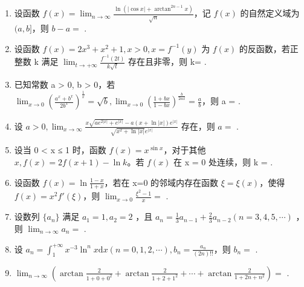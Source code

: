 \documentclass[12pt, a4paper]{ctexart}
\begin{document}
\begin{enumerate}[start=20]
    \item 设函数 $ f(x) = \lim_{n \to \infty} \frac{\ln\left(\left|\cos x\right| + \arctan^{2n-1}x\right)}{\sqrt{n}} $，记 $ f(x) $ 的自然定义域为 $ (a, b] $，则 $ b - a = $ \underline{\hspace{2cm}}.
    
    \item 设函数 $ f(x)=2x^{3}+x^{2}+1, x>0, x=f^{-1}(y) $ 为 $ f(x) $ 的反函数，若正整数 k 满足 $ \lim_{t\to+\infty}\frac{f^{-1}(2t)}{k\sqrt{t}} $ 存在且非零，则 k= \underline{\hspace{2cm}}.

    \item 已知常数 a > 0, b > 0，若 $ \lim_{x \to 0} \left( \frac{a^x + b^x}{2b^x} \right)^{\frac{1}{x}} = \sqrt{b}, \lim_{x \to 0} \left( \frac{1 + bx}{1 - bx} \right)^{\frac{b}{2ax}} = \frac{a}{b} $，则 a = \underline{\hspace{2cm}}.

    \item 设 $ a > 0, \lim_{x \to \infty} \frac{x \sqrt{a e^{2|x|} + e^{|x|}} - a(x + \ln|x|) e^{|x|}}{\sqrt{x^2 + \ln|x|} e^{|x|}} $ 存在，则 $ a = $ \underline{\hspace{2cm}}.

    \item 设当 0 < x ≤ 1 时，函数 $ f(x) = x^{\sin x} $，对于其他 $ x, f(x) = 2f(x + 1) - \ln k $。若 $ f(x) $ 在 x = 0 处连续，则 k = \underline{\hspace{2cm}}.

    \item 设函数 $ f(x)=\ln\frac{1-x}{1+x} $，若在 x=0 的邻域内存在函数 $ \xi=\xi(x) $，使得 $ f(x)=x^{2}f'(\xi) $，则 $ \lim_{x\to0}\frac{\xi^{2}-1}{x}= $ \underline{\hspace{2cm}}.

    \item 设数列 $ \{a_{n}\} $ 满足 $ a_{1}=1, a_{2}=2 $ ，且 $ a_{n}=\frac{1}{3}a_{n-1}+\frac{2}{3}a_{n-2}(n=3,4,5,\cdots) $ ，则 $ \lim_{n\to\infty}a_n= $ \underline{\hspace{2cm}}.

    \item 设 $ a_{n}=\int_{1}^{+\infty}x^{-3}\ln^{n}x\mathrm{d}x\left(n=0,1,2,\cdots\right),b_{n}=\frac{a_{n}}{(2n)!!} $，则 $ b_{n}= $ \underline{\hspace{2cm}}.

    \item $ \lim_{n\to\infty}\left(\arctan\frac{2}{1+0+0^{2}}+\arctan\frac{2}{1+2+1^{2}}+\cdots+\arctan\frac{2}{1+2n+n^{2}}\right)= $ \underline{\hspace{2cm}}.


\end{enumerate}
\end{document}
